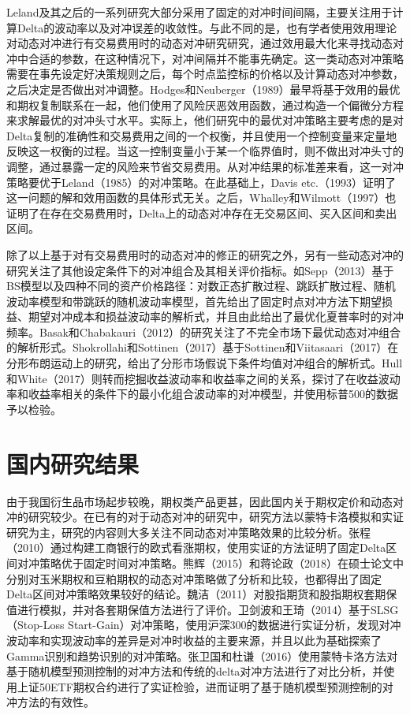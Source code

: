 Leland及其之后的一系列研究大部分采用了固定的对冲时间间隔，主要关注用于计算Delta的波动率以及对冲误差的收敛性。与此不同的是，也有学者使用效用理论对动态对冲进行有交易费用时的动态对冲研究研究，通过效用最大化来寻找动态对冲中合适的参数，在这种情况下，对冲间隔并不能事先确定。这一类动态对冲策略需要在事先设定好决策规则之后，每个时点监控标的价格以及计算动态对冲参数，之后决定是否做出对冲调整。Hodges和Neuberger（1989）最早将基于效用的最优和期权复制联系在一起，他们使用了风险厌恶效用函数，通过构造一个偏微分方程来求解最优的对冲头寸水平。实际上，他们研究中的最优对冲策略主要考虑的是对Delta复制的准确性和交易费用之间的一个权衡，并且使用一个控制变量来定量地反映这一权衡的过程。当这一控制变量小于某一个临界值时，则不做出对冲头寸的调整，通过暴露一定的风险来节省交易费用。从对冲结果的标准差来看，这一对冲策略要优于Leland（1985）的对冲策略。在此基础上，Davis etc.（1993）证明了这一问题的解和效用函数的具体形式无关。之后，Whalley和Wilmott（1997）也证明了在存在交易费用时，Delta上的动态对冲存在无交易区间、买入区间和卖出区间。

除了以上基于对有交易费用时的动态对冲的修正的研究之外，另有一些动态对冲的研究关注了其他设定条件下的对冲组合及其相关评价指标。如Sepp（2013）基于BS模型以及四种不同的资产价格路径：对数正态扩散过程、跳跃扩散过程、随机波动率模型和带跳跃的随机波动率模型，首先给出了固定时点对冲方法下期望损益、期望对冲成本和损益波动率的解析式，并且由此给出了最优化夏普率时的对冲频率。Basak和Chabakauri（2012）的研究关注了不完全市场下最优动态对冲组合的解析形式。Shokrollahi和Sottinen（2017）基于Sottinen和Viitasaari（2017）在分形布朗运动上的研究，给出了分形市场假说下条件均值对冲组合的解析式。Hull和White（2017）则转而挖掘收益波动率和收益率之间的关系，探讨了在收益波动率和收益率相关的条件下的最小化组合波动率的对冲模型，并使用标普500的数据予以检验。

\section{国内研究结果}

由于我国衍生品市场起步较晚，期权类产品更甚，因此国内关于期权定价和动态对冲的研究较少。在已有的对于动态对冲的研究中，研究方法以蒙特卡洛模拟和实证研究为主，研究的内容则大多关注不同动态对冲策略效果的比较分析。张程（2010）通过构建工商银行的欧式看涨期权，使用实证的方法证明了固定Delta区间对冲策略优于固定时间对冲策略。熊辉（2015）和蒋论政（2018）在硕士论文中分别对玉米期权和豆粕期权的动态对冲策略做了分析和比较，也都得出了固定Delta区间对冲策略效果较好的结论。魏洁（2011）对股指期货和股指期权套期保值进行模拟，并对各套期保值方法进行了评价。卫剑波和王琦（2014）基于SLSG（Stop-Loss Start-Gain）对冲策略，使用沪深300的数据进行实证分析，发现对冲波动率和实现波动率的差异是对冲时收益的主要来源，并且以此为基础探索了Gamma识别和趋势识别的对冲策略。张卫国和杜谦（2016）使用蒙特卡洛方法对基于随机模型预测控制的对冲方法和传统的delta对冲方法进行了对比分析，并使用上证50ETF期权合约进行了实证检验，进而证明了基于随机模型预测控制的对冲方法的有效性。

